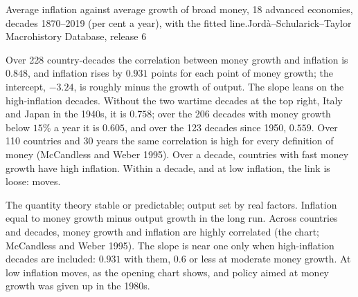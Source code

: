 \begin{omchart}{Average inflation against average growth of broad money, 18
advanced economies, decades 1870--2019 (per cent a year), with the fitted
line.}{Jord\`a--Schularick--Taylor Macrohistory Database, release 6}
\end{omchart}

Over 228 country-decades the correlation between money growth and
inflation is $0.848$, and inflation rises by $0.931$ points for each point of
money growth; the intercept, $-3.24$, is roughly minus the growth of output.
The slope leans on the high-inflation decades. Without the two wartime
decades at the top right, Italy and Japan in the 1940s, it is $0.758$; over
the 206 decades with money growth below $15\%$ a year it is $0.605$, and over
the 123 decades since 1950, $0.559$. %
Over 110 countries and 30 years the same correlation is high for every
definition of money (McCandless and Weber 1995). %
Over a decade, countries with fast money growth have high inflation. Within
a decade, and at low inflation, the link is loose:  moves.

\begin{model}{The quantity theory}
\assumes {} stable or predictable; output set by real factors.
\predicts Inflation equal to money growth minus output growth in the long
run.
\tested Across countries and decades, money growth and inflation are
highly correlated (the chart; McCandless and Weber
1995). %
The slope is near one only when high-inflation decades are included:
$0.931$ with them, $0.6$ or less at moderate money growth. %
\breaks At low inflation  moves, as the opening chart shows, and
policy aimed at money growth was given up in the 1980s.
\end{model}

